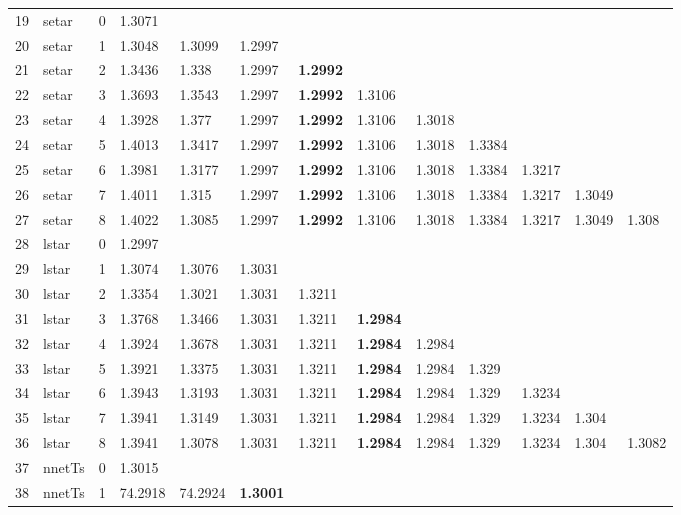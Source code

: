 \documentclass[10pt,a4paper]{article}
\begin{document}
\begin{table}[ht]
\begin{tabular}{rlrllllllllll}
   \hline
19 & setar &     0 & 1.3071 &  &  &  &  &  &  &  &  &  \\ 
  20 & setar &     1 & 1.3048 & 1.3099 & 1.2997 &  &  &  &  &  &  &  \\ 
  21 & setar &     2 & 1.3436 & 1.338 & 1.2997 & \textbf{1.2992} &  &  &  &  &  &  \\ 
  22 & setar &     3 & 1.3693 & 1.3543 & 1.2997 & \textbf{1.2992} & 1.3106 &  &  &  &  &  \\ 
  23 & setar &     4 & 1.3928 & 1.377 & 1.2997 & \textbf{1.2992} & 1.3106 & 1.3018 &  &  &  &  \\ 
  24 & setar &     5 & 1.4013 & 1.3417 & 1.2997 & \textbf{1.2992} & 1.3106 & 1.3018 & 1.3384 &  &  &  \\ 
  25 & setar &     6 & 1.3981 & 1.3177 & 1.2997 & \textbf{1.2992} & 1.3106 & 1.3018 & 1.3384 & 1.3217 &  &  \\ 
  26 & setar &     7 & 1.4011 & 1.315 & 1.2997 & \textbf{1.2992} & 1.3106 & 1.3018 & 1.3384 & 1.3217 & 1.3049 &  \\ 
  27 & setar &     8 & 1.4022 & 1.3085 & 1.2997 & \textbf{1.2992} & 1.3106 & 1.3018 & 1.3384 & 1.3217 & 1.3049 & 1.308 \\ 
   \hline
28 & lstar &     0 & 1.2997 &  &  &  &  &  &  &  &  &  \\ 
  29 & lstar &     1 & 1.3074 & 1.3076 & 1.3031 &  &  &  &  &  &  &  \\ 
  30 & lstar &     2 & 1.3354 & 1.3021 & 1.3031 & 1.3211 &  &  &  &  &  &  \\ 
  31 & lstar &     3 & 1.3768 & 1.3466 & 1.3031 & 1.3211 & \textbf{1.2984} &  &  &  &  &  \\ 
  32 & lstar &     4 & 1.3924 & 1.3678 & 1.3031 & 1.3211 & \textbf{1.2984} & 1.2984 &  &  &  &  \\ 
  33 & lstar &     5 & 1.3921 & 1.3375 & 1.3031 & 1.3211 & \textbf{1.2984} & 1.2984 & 1.329 &  &  &  \\ 
  34 & lstar &     6 & 1.3943 & 1.3193 & 1.3031 & 1.3211 & \textbf{1.2984} & 1.2984 & 1.329 & 1.3234 &  &  \\ 
  35 & lstar &     7 & 1.3941 & 1.3149 & 1.3031 & 1.3211 & \textbf{1.2984} & 1.2984 & 1.329 & 1.3234 & 1.304 &  \\ 
  36 & lstar &     8 & 1.3941 & 1.3078 & 1.3031 & 1.3211 & \textbf{1.2984} & 1.2984 & 1.329 & 1.3234 & 1.304 & 1.3082 \\ 
   \hline
37 & nnetTs &     0 & 1.3015 &  &  &  &  &  &  &  &  &  \\ 
  38 & nnetTs &     1 & 74.2918 & 74.2924 & \textbf{1.3001} &  &  &  &  &  &  &  \\ 

\end{tabular}
\end{table}
\end{document}
